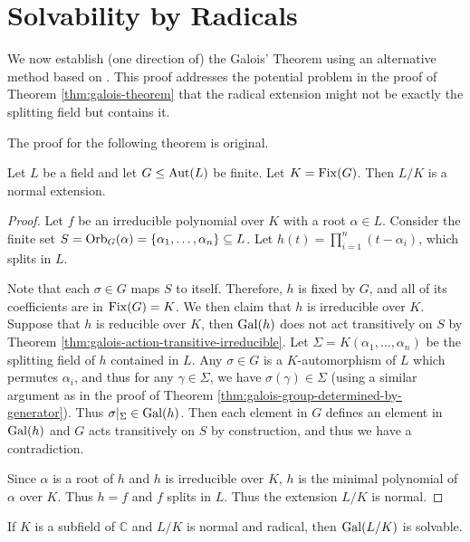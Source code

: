 \section{Solvability by Radicals} \label{sec:radical-alter}

We now establish (one direction of) the Galois' Theorem using an alternative method based on \cite[Chapter~15]{Stewart}. This proof addresses the potential problem in the proof of Theorem \ref{thm:galois-theorem} that the radical extension might not be exactly the splitting field but contains it.  

The proof for the following theorem is original. 
\begin{theorem} \label{thm:fix-extension-normal}
	Let $L$ be a field and let $G \le \operatorname{Aut}(L)$ be finite. Let $K = \operatorname{Fix}(G)$. Then $L/K$ is a normal extension.
\end{theorem}

\begin{proof}
	
	Let $f$ be an irreducible polynomial over $K$ with a root $\alpha \in L$. Consider the finite set $S = \operatorname{Orb}_G(\alpha) = \{ \alpha_1, \ldots, \alpha_n\} \subseteq L$. Let $h(t) = \prod_{i = 1} ^n (t - \alpha_i)$, which splits in $L$.
	
	Note that each $\sigma \in G$ maps $S$ to itself. Therefore, $h$ is fixed by $G$, and all of its coefficients are in $\operatorname{Fix}(G) = K$. We then claim that $h$ is irreducible over $K$. Suppose that $h$ is reducible over $K$, then $\operatorname{Gal}(h)$ does not act transitively on $S$ by Theorem \ref{thm:galois-action-transitive-irreducible}. Let $\Sigma = K(\alpha_1, \dots, \alpha_n)$ be the splitting field of $h$ contained in $L$.  Any $\sigma \in G$ is a $K$-automorphism of $L$ which permutes $\alpha_i$, and thus for any $\gamma \in \Sigma$, we have $\sigma(\gamma) \in \Sigma$ (using a similar argument as in the proof of Theorem \ref{thm:galois-group-determined-by-generator}). Thus $\sigma | _ \Sigma \in \operatorname{Gal}(h)$. 
	Then each element in $G$ defines an element in $\operatorname{Gal}(h)$ and $G$ acts transitively on $S$ by construction, and thus we have a contradiction. 
	
	Since $\alpha$ is a root of $h$ and $h$ is irreducible over $K$, $h$ is the minimal polynomial of $\alpha$ over $K$. Thus $h = f$ and $f$ splits in $L$. Thus the extension $L/K$ is normal. 
\end{proof}


\begin{theorem} \label{thm:radical-3}
	If $K$ is a subfield of $\mathbb{C}$ and $L / K$ is normal and radical, then $\operatorname{Gal}(L / K)$ is solvable.
\end{theorem}

